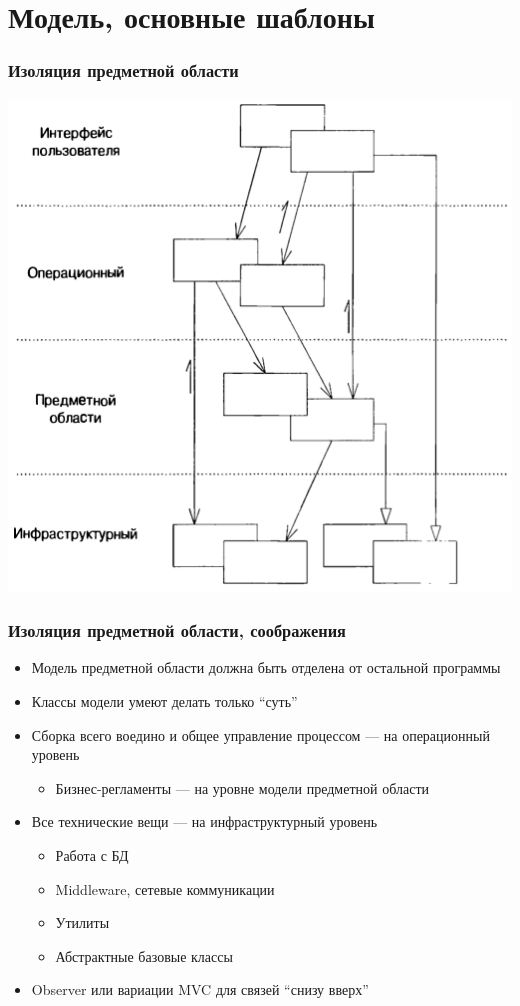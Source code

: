 \documentclass[xetex,mathserif,serif]{beamer}
\begin{document}
	\section{Модель, основные шаблоны}

	\begin{frame}
		\frametitle{Изоляция предметной области}
		\begin{center}
			\includegraphics[height=0.8\textheight]{layers.png}
		\end{center}
	\end{frame}

	\begin{frame}
		\frametitle{Изоляция предметной области, соображения}
		\begin{itemize}
			\item Модель предметной области должна быть отделена от остальной программы
			\item Классы модели умеют делать только ``суть''
			\item Сборка всего воедино и общее управление процессом --- на операционный уровень
			\begin{itemize}
				\item Бизнес-регламенты --- на уровне модели предметной области
			\end{itemize}
			\item Все технические вещи --- на инфраструктурный уровень
			\begin{itemize}
				\item Работа с БД
				\item Middleware, сетевые коммуникации
				\item Утилиты
				\item Абстрактные базовые классы
			\end{itemize}
			\item Observer или вариации MVC для связей ``снизу вверх''
		\end{itemize}
	\end{frame}
\end{document}
